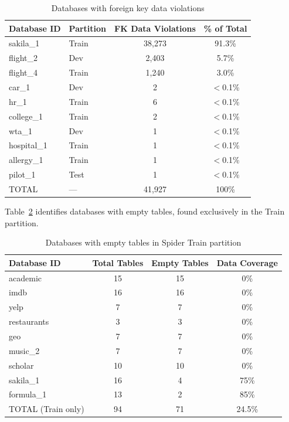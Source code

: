 \documentclass[print]{einformatica}
\begin{document}
\begin{table}[ht]
    \caption{Databases with foreign key data violations}
    \label{tab:schema_fk_data_violations}
    \centering
    \footnotesize
    \begin{tabular}{llcc}
        \toprule
        \textbf{Database ID} & \textbf{Partition} & \textbf{FK Data Violations} & \textbf{\% of Total} \\
        \midrule
        sakila\_1 & Train & 38,273 & 91.3\% \\
        flight\_2 & Dev & 2,403 & 5.7\% \\
        flight\_4 & Train & 1,240 & 3.0\% \\
        car\_1 & Dev & 2 & $<$0.1\% \\
        hr\_1 & Train & 6 & $<$0.1\% \\
        college\_1 & Train & 2 & $<$0.1\% \\
        wta\_1 & Dev & 1 & $<$0.1\% \\
        hospital\_1 & Train & 1 & $<$0.1\% \\
        allergy\_1 & Train & 1 & $<$0.1\% \\
        pilot\_1 & Test & 1 & $<$0.1\% \\
        \midrule
        TOTAL & --- & 41,927 & 100\% \\
        \bottomrule
    \end{tabular}
\end{table}

Table~\ref{tab:schema_empty_tables} identifies databases with empty tables, found exclusively in the Train partition.

\begin{table}[ht]
    \caption{Databases with empty tables in Spider Train partition}
    \label{tab:schema_empty_tables}
    \centering
    \footnotesize
    \begin{tabular}{lccc}
        \toprule
        \textbf{Database ID} & \textbf{Total Tables} & \textbf{Empty Tables} & \textbf{Data Coverage} \\
        \midrule
        academic & 15 & 15 & 0\% \\
        imdb & 16 & 16 & 0\% \\
        yelp & 7 & 7 & 0\% \\
        restaurants & 3 & 3 & 0\% \\
        geo & 7 & 7 & 0\% \\
        music\_2 & 7 & 7 & 0\% \\
        scholar & 10 & 10 & 0\% \\
        sakila\_1 & 16 & 4 & 75\% \\
        formula\_1 & 13 & 2 & 85\% \\
        \midrule
        TOTAL (Train only) & 94 & 71 & 24.5\% \\
        \bottomrule
    \end{tabular}
\end{table}
\end{document}
